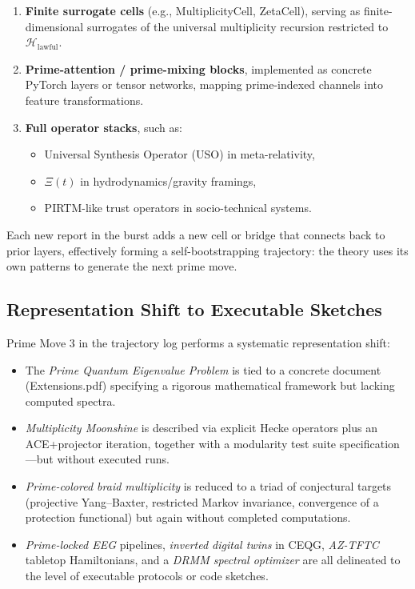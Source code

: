 \documentclass[11pt]{article}
\begin{document}
\begin{enumerate}[leftmargin=*]
  \item \textbf{Finite surrogate cells} (e.g., MultiplicityCell, ZetaCell), serving as finite-dimensional surrogates of the universal multiplicity recursion restricted to \(\mathcal{H}_\text{lawful}\).
  \item \textbf{Prime-attention / prime-mixing blocks}, implemented as concrete PyTorch layers or tensor networks, mapping prime-indexed channels into feature transformations.
  \item \textbf{Full operator stacks}, such as:
    \begin{itemize}
      \item Universal Synthesis Operator (USO) in meta-relativity,
      \item \(\Xi(t)\) in hydrodynamics/gravity framings,
      \item PIRTM-like trust operators in socio-technical systems.
    \end{itemize}
\end{enumerate}

Each new report in the burst adds a new cell or bridge that connects back to prior layers, effectively forming a self-bootstrapping trajectory: the theory uses its own patterns to generate the next prime move.

\subsection{Representation Shift to Executable Sketches}

Prime Move 3 in the trajectory log performs a systematic representation shift:

\begin{itemize}[leftmargin=*]
  \item The \emph{Prime Quantum Eigenvalue Problem} is tied to a concrete document (Extensions.pdf) specifying a rigorous mathematical framework but lacking computed spectra.
  \item \emph{Multiplicity Moonshine} is described via explicit Hecke operators plus an ACE+projector iteration, together with a modularity test suite specification---but without executed runs.
  \item \emph{Prime-colored braid multiplicity} is reduced to a triad of conjectural targets (projective Yang--Baxter, restricted Markov invariance, convergence of a protection functional) but again without completed computations.
  \item \emph{Prime-locked EEG} pipelines, \emph{inverted digital twins} in CEQG, \emph{AZ-TFTC} tabletop Hamiltonians, and a \emph{DRMM spectral optimizer} are all delineated to the level of executable protocols or code sketches.
\end{itemize}
\end{document}
